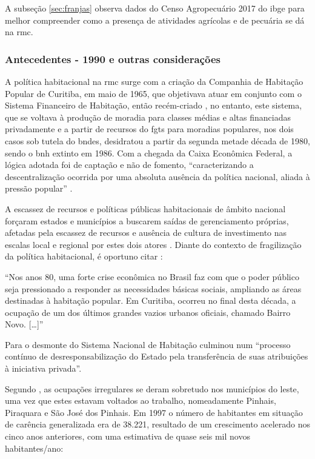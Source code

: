 	A subseção \autoref{sec:franjas} observa dados do Censo Agropecuário 2017 do \glsdesc{ibge} para melhor compreender como a presença de atividades agrícolas e de pecuária se dá na \glsdesc{rmc}.
	
	\subsubsection{Antecedentes - 1990 e outras considerações}
	
	A política habitacional na \glsdesc{rmc} surge com a criação da Companhia de Habitação Popular de Curitiba, em maio de 1965, que objetivava atuar em conjunto com o Sistema Financeiro de Habitação, então recém-criado \cite[p. 81]{colin2009a}, no entanto, este sistema, que se voltava à produção de moradia para classes médias e altas financiadas privadamente e a partir de recursos do \gls{fgts} para moradias populares, nos dois casos sob tutela do \gls{bndes}, desidratou a partir da segunda metade década de 1980, sendo o \gls{bnh} extinto em 1986. Com a chegada da Caixa Econômica Federal, a lógica adotada foi de captação e não de fomento, ``caracterizando a descentralização ocorrida por uma absoluta ausência da política nacional, aliada à pressão popular'' \cite[p. 82]{colin2009a}.
	
	A escassez de recursos e políticas públicas habitacionais de âmbito nacional forçaram estados e municípios a buscarem saídas de gerenciamento próprias, afetadas pela escassez de recursos e ausência de cultura de investimento nas escalas local e regional por estes dois atores \cite[p. 82]{colin2009a}. Diante do contexto de fragilização da política habitacional, é oportuno citar :
	
	\begin{citacao}
		``Nos anos 80, uma forte crise econômica no Brasil faz com que o poder público seja pressionado a responder as necessidades básicas sociais, ampliando as áreas destinadas à habitação popular. Em Curitiba, ocorreu no final desta década, a ocupação de um dos últimos grandes vazios urbanos oficiais, chamado Bairro Novo. [\dots]'' \cite[p. 54]{castro2005a}
	\end{citacao}
	
	Para  o desmonte do Sistema Nacional de Habitação culminou num ``processo contínuo de desresponsabilização do Estado pela transferência de suas atribuições à iniciativa privada''.
	
	Segundo \cite[p. 142]{lima2001a}, as ocupações irregulares se deram sobretudo nos municípios do leste, uma vez que estes estavam voltados ao trabalho, nomeadamente  Pinhais, Piraquara e São José dos Pinhais. Em 1997 o número de habitantes em situação de carência generalizada era de 38.221, resultado de um crescimento acelerado nos cinco anos anteriores, com uma estimativa de quase seis mil novos habitantes/ano:
	
